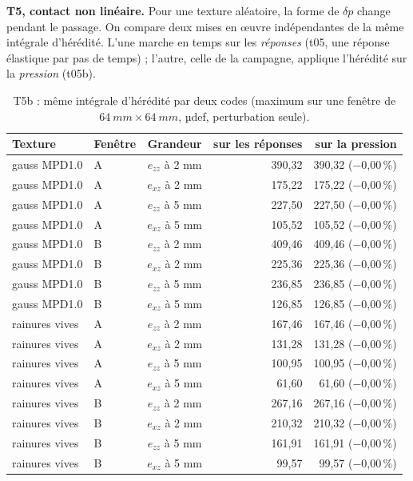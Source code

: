 \textbf{T5, contact non linéaire.} Pour une texture aléatoire, la forme de $\delta p$ change
pendant le passage. On compare deux mises en \oe uvre indépendantes de la même intégrale
d'hérédité. L'une marche en temps sur les \emph{réponses} (t05, une réponse élastique par pas de
temps) ; l'autre, celle de la campagne, applique l'hérédité sur la \emph{pression} (t05b).
\begin{table}[H]\centering\small
\caption{T5b : même intégrale d'hérédité par deux codes (maximum sur une fenêtre de $\SI{64}{mm}\times\SI{64}{mm}$, µdef, perturbation seule).}
\begin{tabular}{llcrr}
\toprule
Texture & Fenêtre & Grandeur & sur les réponses & sur la pression\\
\midrule
gauss MPD1.0 & A & $e_{zz}$ à 2 mm & 390,32 & 390,32 ($-$0,00\,\%)\\
gauss MPD1.0 & A & $e_{xz}$ à 2 mm & 175,22 & 175,22 ($-$0,00\,\%)\\
gauss MPD1.0 & A & $e_{zz}$ à 5 mm & 227,50 & 227,50 ($-$0,00\,\%)\\
gauss MPD1.0 & A & $e_{xz}$ à 5 mm & 105,52 & 105,52 ($-$0,00\,\%)\\
gauss MPD1.0 & B & $e_{zz}$ à 2 mm & 409,46 & 409,46 ($-$0,00\,\%)\\
gauss MPD1.0 & B & $e_{xz}$ à 2 mm & 225,36 & 225,36 ($-$0,00\,\%)\\
gauss MPD1.0 & B & $e_{zz}$ à 5 mm & 236,85 & 236,85 ($-$0,00\,\%)\\
gauss MPD1.0 & B & $e_{xz}$ à 5 mm & 126,85 & 126,85 ($-$0,00\,\%)\\
rainures vives & A & $e_{zz}$ à 2 mm & 167,46 & 167,46 ($-$0,00\,\%)\\
rainures vives & A & $e_{xz}$ à 2 mm & 131,28 & 131,28 ($-$0,00\,\%)\\
rainures vives & A & $e_{zz}$ à 5 mm & 100,95 & 100,95 ($-$0,00\,\%)\\
rainures vives & A & $e_{xz}$ à 5 mm & 61,60 & 61,60 ($-$0,00\,\%)\\
rainures vives & B & $e_{zz}$ à 2 mm & 267,16 & 267,16 ($-$0,00\,\%)\\
rainures vives & B & $e_{xz}$ à 2 mm & 210,32 & 210,32 ($-$0,00\,\%)\\
rainures vives & B & $e_{zz}$ à 5 mm & 161,91 & 161,91 ($-$0,00\,\%)\\
rainures vives & B & $e_{xz}$ à 5 mm & 99,57 & 99,57 ($-$0,00\,\%)\\
\bottomrule
\end{tabular}
\end{table}

